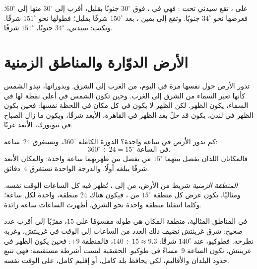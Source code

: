 \begin{example}\label{ex:g6:latitude-longitude:sydney}
على ، تقع سيدني تحت : فهي في ، فوق  $30^\circ$ جنوبًا بقليل، أقرب إلى $30^\circ$
منها إلى $60^\circ$؛ فعرضها نحو $34^\circ$ جنوبًا. وتقع إلى يمين
، بعد  $150^\circ$ شرقًا بقليل؛ فطولها
نحو $151^\circ$ شرقًا. ونكتب: سيدني، $34^\circ$ جنوبًا،
$151^\circ$ شرقًا.
\end{example}

\section{الأرض الدوّارة والمناطق الزمنية}

تدور الأرض حول نفسها مرة في اليوم، من الغرب إلى الشرق. وبدورانها، تبدو
الشمس كأنها تعبر السماء من الشرق إلى الغرب. وحين تكون الشمس في أعلى نقطة
لها في السماء، يكون الظهر. لكن الظهر لا يكون في كل مكان في اللحظة نفسها:
فحين يكون الظهر في لندن، يكون قد حلّ بعد الظهر في القاهرة، الأبعد شرقًا،
ويكون ما زال الصباح في نيويورك، الأبعد غربًا.

كم تدور الأرض في ساعة واحدة؟ الدورة الكاملة $360^\circ$،
وتستغرق 24~ساعة:
\[
360^\circ \div 24 = 15^\circ \text{ في الساعة.}
\]
فالمكانان اللذان يفصل بينهما $15^\circ$ من  يفصل بين ظهريهما ساعة واحدة:
والمكان الأبعد شرقًا يبلغه أولًا. والدرجة الواحدة تستغرق 4~دقائق.

\begin{definition}\label{def:g6:latitude-longitude:time-zone}
\emph{المنطقة الزمنية} شريط من الأرض، من  إلى
، تُظهر فيه كل الساعات الوقت نفسه. ومثاليًا، يكون عرض كل منطقة
$15^\circ$ من ، فيكون هناك 24 منطقة، واحدة لكل
ساعة؛ وكلما انتقلنا منطقة واحدة نحو الشرق، أظهرت الساعات ساعة زائدة.
\end{definition}

في المناطق المثالية، منطقة المكان هي طوله مقسومًا على $15$،
مقرّبًا إلى أقرب عدد صحيح: شرق غرينتش نضيف ذلك العدد من
الساعات إلى الوقت في غرينتش، وغربه نطرحه. فطوكيو، عند
$140^\circ$ شرقًا: $140 \div 15 \approx 9.3$، فالمنطقة $+9$: فحين يكون
الظهر في غرينتش، تكون الساعة 9~مساءً في طوكيو.  الحقيقية ليست أشرطة
مستقيمة: فهي تتبع حدود البلدان والأقاليم، لكي يحافظ بلد كامل،
أو إقليم كامل، على الوقت نفسه.


